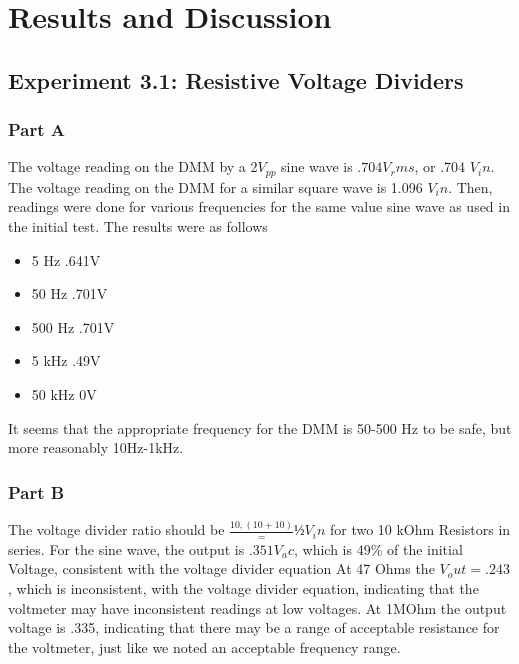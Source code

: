 \documentclass[10pt]{article}
\begin{document}
\section{Results and Discussion}

\subsection{Experiment 3.1: Resistive Voltage Dividers}
\subsubsection{Part A}

	 The voltage reading on the DMM by a 2$V_{pp}$ sine wave is $.704 V_rms$, or .704 $V_in$. The voltage reading on the DMM for a similar square wave is 1.096 $V_in$. Then, readings were done for various frequencies for the same value sine wave as used in the initial test. The results were as follows
\begin{itemize} 
	\item 5 Hz		.641V
	\item 50 Hz		.701V
	\item 500 Hz	.701V
	\item 5 kHz		.49V
	\item 50 kHz	0V
\end{itemize}
	It seems that the appropriate frequency for the DMM is 50-500 Hz to be safe, but more reasonably 10Hz-1kHz.
\subsubsection{Part B}
	 The voltage divider ratio should be $\frac{10,(10+10)} = ½ V_in$  for two 10 kOhm Resistors in series. For the sine wave, the output is $.351 V_ac$, which is 49\% of the initial Voltage, consistent with the voltage divider equation 
	 At 47 Ohms the $V_out = .243$, which is inconsistent, with the voltage divider equation, indicating that the voltmeter may have inconsistent readings at low voltages. 
	 At 1MOhm the output voltage is .335, indicating that there may be a range of acceptable resistance for the voltmeter, just like we noted an acceptable frequency range.
\end{document}
